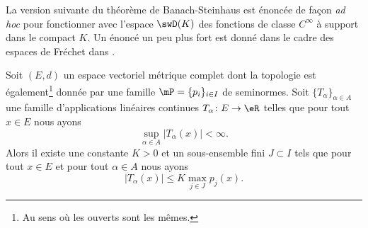 La version suivante du théorème de Banach-Steinhaus est énoncée de façon \emph{ad hoc} pour fonctionner avec l'espace \( \swD(K)\) des fonctions de classe \(  C^{\infty}\) à support dans le compact \( K\). Un énoncé un peu plus fort est donné dans le cadre des espaces de Fréchet dans \cite{TQSWRiz}.
\begin{theorem}  \label{ThoNBrmGIg}
	Soit \( (E,d)\) un espace vectoriel métrique complet dont la topologie est également\footnote{Au sens où les ouverts sont les mêmes.} donnée par une famille \( \mP=\{ p_i \}_{i\in I}\) de seminormes. Soit \( \{ T_{\alpha} \}_{\alpha\in A}\) une famille d'applications linéaires continues \( T_{\alpha}\colon E\to \eR\) telles que pour tout \( x\in E\) nous ayons
	\begin{equation}
		\sup_{\alpha\in A}\big| T_{\alpha}(x) \big|<\infty.
	\end{equation}
	Alors il existe une constante \( K>0\) et un sous-ensemble fini \( J\subset I\) tels que pour tout \( x\in E\) et pour tout \( \alpha\in A\) nous ayons
	\begin{equation}    \label{EqIFNGhtr}
		\big| T_{\alpha} (x)\big|\leq K\max_{j\in J}p_j(x).
	\end{equation}
\end{theorem}

